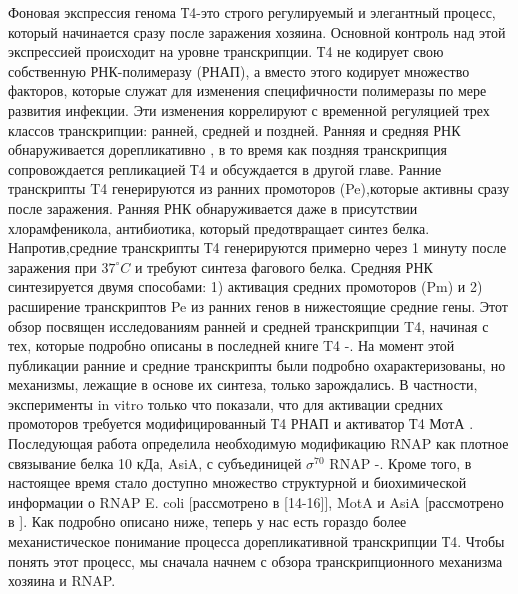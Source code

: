 \documentclass[a4paper,12pt]{article}
\begin{document}
        \par{
        Фоновая экспрессия генома Т4-это строго регулируемый и элегантный процесс, который начинается сразу после заражения
        хозяина. Основной контроль над этой экспрессией происходит на уровне транскрипции. Т4 не кодирует свою собственную
        РНК-полимеразу (РНАП), а вместо этого кодирует множество факторов, которые служат для изменения специфичности
        полимеразы по мере развития инфекции. Эти изменения коррелируют с временной регуляцией трех классов транскрипции:
        ранней, средней и поздней. Ранняя и средняя РНК обнаруживается дорепликативно
        \cite{hinton1,hinton2,hinton3,hinton4,hinton5,hinton6}, в то время как поздняя транскрипция сопровождается
        репликацией Т4 и обсуждается в другой главе. Ранние транскрипты T4 генерируются из ранних промоторов (Pe),которые
        активны сразу после заражения. Ранняя РНК обнаруживается даже в присутствии хлорамфеникола, антибиотика, который
        предотвращает синтез белка. Напротив,средние транскрипты Т4 генерируются примерно через 1 минуту после заражения при
        \(37^\circ C\)  и требуют синтеза фагового белка. Средняя РНК синтезируется двумя способами: 1) активация средних
        промоторов (Pm) и 2) расширение транскриптов Pe из ранних генов в нижестоящие средние гены. Этот обзор посвящен
        исследованиям ранней и средней транскрипции T4, начиная с тех, которые подробно описаны в последней книге T4
        \cite{hinton1}-\cite{hinton5}. На момент этой публикации ранние и средние транскрипты были подробно охарактеризованы,
        но механизмы, лежащие в основе их синтеза, только зарождались. В частности, эксперименты in vitro только что
        показали, что для активации средних промоторов требуется модифицированный Т4 РНАП и активатор Т4 МотА
        \cite{hinton7,hinton8}. Последующая работа определила необходимую модификацию RNAP как плотное связывание белка 10
        кДа, AsiA, с субъединицей \(\sigma^{70}\) RNAP \cite{hinton9}-\cite{hinton13}. Кроме того, в настоящее время стало
        доступно множество структурной и биохимической информации о RNAP E. coli [рассмотрено в [14-16]], MotA и AsiA
        [рассмотрено в \cite{hinton2}]. Как подробно описано ниже, теперь у нас есть гораздо более механистическое понимание
        процесса дорепликативной транскрипции Т4. Чтобы понять этот процесс, мы сначала начнем с обзора транскрипционного
        механизма хозяина и RNAP.} \\ 
\end{document}
